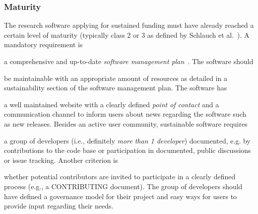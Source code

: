 \documentclass[a4paper,num-refs,numbers,sort&compress]{de-rse}
\begin{document}
\subsubsection{Maturity}
The research software applying for sustained funding must have already reached a certain level of maturity (typically class 2 or 3 as defined by Schlauch et al.~\cite{https://doi.org/10.5281/zenodo.1344612}). A mandatory requirement is 
\begin{inlinelist}[resume]
    \item a comprehensive and up-to-date \textit{software management plan}~\cite{SSImanage}. The software should 
    \item be maintainable with an appropriate amount of resources as detailed in a sustainability section of the software management plan. The software has 
    \item a well maintained website with a clearly defined \textit{point of contact} and a communication channel to inform users about news regarding the software such as new releases. Besides an active user community, sustainable software requires 
    \item a group of developers (i.e., definitely \textit{more than 1 developer}) documented, e.g. by contributions to the code base or participation in documented, public discussions or issue tracking. Another criterion is 
    \item whether potential contributors are invited to participate in a clearly defined process (e.g., a CONTRIBUTING document). The group of developers should have defined a governance model for their project and easy ways for users to provide input regarding their needs.
\end{inlinelist}
\end{document}
